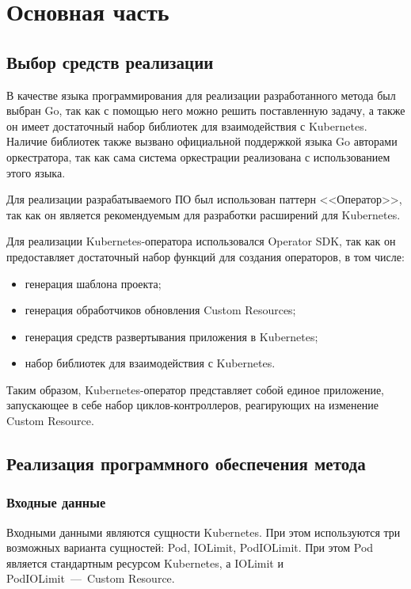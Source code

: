 \chapter{Основная часть}

\section{Выбор средств реализации}

В качестве языка программирования для реализации разработанного метода был выбран Go, так как с помощью него можно решить поставленную задачу, а также он имеет достаточный набор библиотек для взаимодействия с Kubernetes. Наличие библиотек также вызвано официальной поддержкой языка Go авторами оркестратора, так как сама система оркестрации реализована с использованием этого языка.

Для реализации разрабатываемого ПО был использован паттерн <<Оператор>>, так как он является рекомендуемым для разработки расширений для Kubernetes.

Для реализации Kubernetes-оператора использовался Operator SDK, так как он предоставляет достаточный набор функций для создания операторов, в том числе:

\begin{itemize}
	\item генерация шаблона проекта;
	\item генерация обработчиков обновления Custom Resources;
	\item генерация средств развертывания приложения в Kubernetes;
	\item набор библиотек для взаимодействия с Kubernetes.
\end{itemize}

Таким образом, Kubernetes-оператор представляет собой единое приложение, запускающее в себе набор циклов-контроллеров, реагирующих на изменение Custom Resource.

\section{Реализация программного обеспечения метода}

\subsection{Входные данные}

Входными данными являются сущности Kubernetes. При этом используются три возможных варианта сущностей: Pod, IOLimit, PodIOLimit. При этом Pod является стандартным ресурсом Kubernetes, а IOLimit и PodIOLimit~---~Custom Resource.

